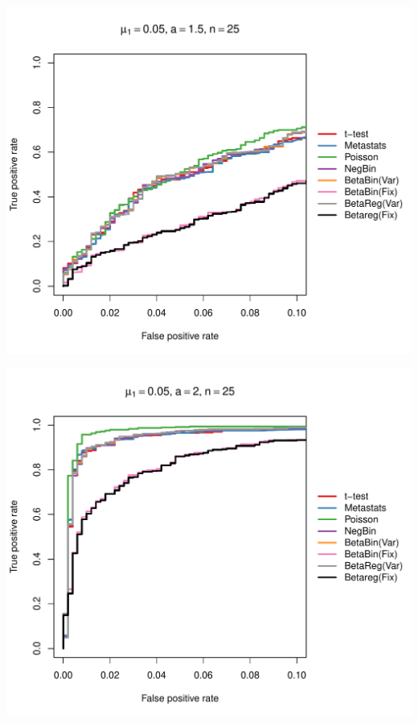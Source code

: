 \documentclass[12pt]{article}\usepackage{graphicx, color}
\makeatletter
\def\maxwidth{ %
  \ifdim\Gin@nat@width>\linewidth
    \linewidth
  \else
    \Gin@nat@width
  \fi
}
\newenvironment{knitrout}{}{} %
\makeatother
\begin{document}
\begin{knitrout}
{\centering \includegraphics[width=\maxwidth]{figure/rocs67} 

}




{\centering \includegraphics[width=\maxwidth]{figure/rocs68} 

}





\end{knitrout}
\end{document}
